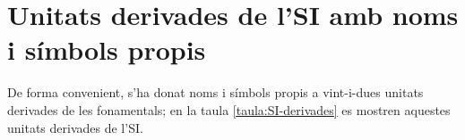  
      
       
       
                    \index{\unit{\micro\noop}}   


\section{Unitats derivades de l'SI amb noms i símbols propis}
\label{sec:unitats-derv-SI}

De forma convenient, s'ha donat noms i símbols propis a vint-i-dues unitats derivades de les fonamentals; en la taula \vref{taula:SI-derivades} es mostren aquestes unitats derivades de l'SI.

